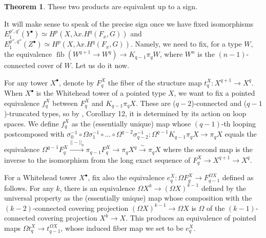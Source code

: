 \documentclass{amsart}
\theoremstyle{definition}
\newtheorem{thm}[theorem]{Theorem}
\newcommand{\fib}{\operatorname{fib}}
\begin{document}
\begin{thm}\label{th:products-coincide}
    These two products are equivalent up to a sign.
\end{thm}

It will make sense to speak of the precise sign once we have fixed isomorphisms $E_1^{p',q'}(Y^\bullet) \simeq H^p(X, \lambda x. H^q(F_x, G))$ and $E^{p'',q''}_1(Z^\bullet) \simeq H^p(X, \lambda x. H^q(F_x, G))$. Namely, we need to fix, for a type $W$, the equivalence $\fib({W^{q+1} \to W^{q}}) \to K_{q-1}\pi_qW$, where $W^n$ is the $(n-1)$-connected cover of $W$.
Let us do it now.

For any tower $X^\bullet$, denote by $F^X_q$ the fiber of the structure map $t_q^X: X^{q+1} \to X^q$. When $X^\bullet$ is the Whitehead tower of a pointed type $X$, we want to fix a pointed equivalence $f^X_q$ between $F^X_q$ and $K_{q-1}\pi_qX$. These are ($q-2$)-connected and ($q-1$)-truncated types, so by \cite{Warn}, Corollary 12, it is determined by its action on loop spaces. We define $f^X_q$ as the (essentially unique) map whose $(q-1)$-th looping postcomposed with $\sigma_0^{-1} \circ \Omega \sigma_1^{-1} \circ \ldots \circ \Omega^{q-2} \sigma_{q-2}^{-1}: \Omega^{q-1}K_{q-1}\pi_{q} X \to \pi_{q} X$ equals the equivalence $\Omega^{q-1}F_{q}^{X} \xrightarrow{||-||_0} \pi_{q-1}F_{q}^{X} \to \pi_{q}X^{q} \xrightarrow{\sim} \pi_{q}X$ where the second map is the inverse to the isomorphism from the long exact sequence of $F_q^X \to X^{q+1} \to X^q$.

For a Whitehead tower $X^{\bullet}$, fix also the equivalence $e_q^X: \Omega F_q^X \to F_{q-1}^{\Omega X}$ defined as follows. For any $k$, there is an equivalence $\Omega X^k \to (\Omega X)^{k-1}$ defined by the universal property as the (essentially unique) map whose composition with the $(k-2)$-connected covering projection $(\Omega X)^{k-1} \to \Omega X$ is $\Omega$ of the $(k-1)$-connected covering projection $X^k \to X$. This produces an equivalence of pointed maps $\Omega t_q^X \to t_{q-1}^{\Omega X}$, whose induced fiber map we set to be $e^X_q$.
\end{document}
